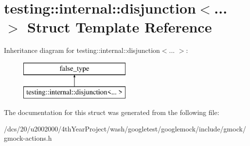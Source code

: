 \hypertarget{structtesting_1_1internal_1_1disjunction}{}\section{testing\+:\+:internal\+:\+:disjunction$<$... $>$ Struct Template Reference}
\label{structtesting_1_1internal_1_1disjunction}
Inheritance diagram for testing\+:\+:internal\+:\+:disjunction$<$... $>$\+:\begin{figure}[H]
\begin{center}
\leavevmode
\includegraphics[height=2.000000cm]{structtesting_1_1internal_1_1disjunction}
\end{center}
\end{figure}


The documentation for this struct was generated from the following file\+:\begin{DoxyCompactItemize}
\item 
/dcs/20/u2002000/4th\+Year\+Project/wash/googletest/googlemock/include/gmock/gmock-\/actions.\+h\end{DoxyCompactItemize}
